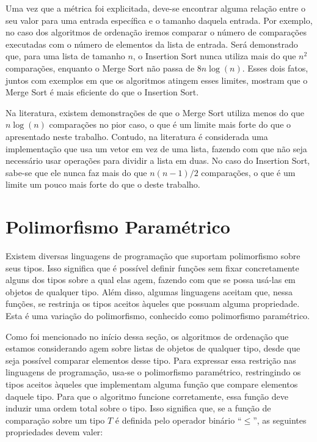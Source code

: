 \documentclass[12pt, oneside, a4paper,english,brazil]{abntex2}
\begin{document}
\qquad Uma vez que a m\'etrica foi explicitada, deve-se encontrar alguma rela\c{c}\~ao entre o seu valor para
uma entrada espec\'ifica e o tamanho daquela entrada. Por exemplo, no caso dos algoritmos de ordena\c{c}\~ao
iremos comparar o n\'umero de compara\c{c}\~oes executadas com o n\'umero de elementos da lista de entrada.
Ser\'a demonstrado que, para uma lista de tamanho $n$, o Insertion Sort nunca utiliza mais do que $n^{2}$ compara\c{c}\~oes, enquanto o Merge Sort n\~ao passa de $8 n \log (n)$. Esses dois fatos,
juntos com exemplos em que os algoritmos atingem esses limites, mostram que o Merge Sort \'e mais eficiente
do que o Insertion Sort.

\qquad Na literatura, existem demonstra\c{c}\~oes de que o Merge Sort utiliza menos do que $n\log(n)$
compara\c{c}\~oes no pior caso\cite{1}, o que \'e um limite mais forte do que o apresentado neste trabalho. Contudo, na literatura \'e considerada uma implementa\c{c}\~ao que usa um vetor em vez de uma lista,
fazendo com que n\~ao seja necess\'ario usar opera\c{c}\~oes para dividir a lista em duas. No caso do Insertion Sort, sabe-se que ele nunca faz mais do
que $n(n - 1) / 2$ compara\c{c}\~oes, o que \'e um limite um pouco mais forte
do que o deste trabalho.

\section{Polimorfismo Param\'etrico}

\qquad Existem diversas linguagens de programa\c{c}\~ao que suportam polimorfismo sobre seus tipos. Isso
significa que \'e poss\'ivel definir fun\c{c}\~oes sem fixar concretamente alguns dos tipos sobre a qual elas
agem, fazendo com que se possa us\'a-las em objetos de qualquer tipo. Al\'em disso, algumas linguagens
aceitam que, nessa fun\c{c}\~oes, se restrinja os tipos aceitos \`aqueles que possuam alguma propriedade.
Esta \'e uma varia\c{c}\~ao do polimorfismo, conhecido como polimorfismo param\'etrico.

\qquad Como foi mencionado no in\'icio dessa se\c{c}\~ao, os algoritmos de ordena\c{c}\~ao que estamos
considerando agem sobre listas de objetos de qualquer tipo, desde que seja poss\'ivel comparar elementos
desse tipo. Para expressar essa restri\c{c}\~ao nas linguagens de programa\c{c}\~ao, usa-se o polimorfismo
param\'etrico, restringindo os tipos aceitos \`aqueles que implementam alguma fun\c{c}\~ao que compare
elementos daquele tipo. Para que o algoritmo funcione corretamente, essa fun\c{c}\~ao deve induzir uma ordem
total sobre o tipo. Isso significa que, se a fun\c{c}\~ao de compara\c{c}\~ao sobre um tipo $T$ \'e definida
pelo operador bin\'ario ``$\le$'', as seguintes propriedades devem valer:
\end{document}

